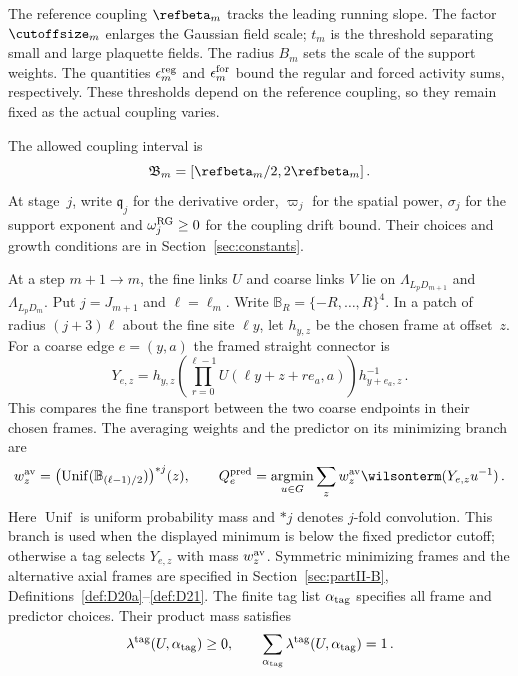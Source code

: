 The reference coupling $\refbeta_m$ tracks the leading running slope. The factor $\cutoffsize_m$ enlarges the Gaussian field scale; $t_m$ is the threshold separating small and large plaquette fields. The radius $B_m$ sets the scale of the support weights. The quantities $\epsilon_m^{\rm reg}$ and $\epsilon_m^{\rm for}$ bound the regular and forced activity sums, respectively. These thresholds depend on the reference coupling, so they remain fixed as the actual coupling varies.

The allowed coupling interval is
\begin{equation*}
\mathfrak B_m=[\refbeta_m/2,2\refbeta_m]\,.
\end{equation*}
At stage~$j$, write $\mathfrak q_j$ for the derivative order, $\varpi_j$ for the spatial power, $\sigma_j$ for the support exponent and $\omega_j^{\rm RG}\ge0$ for the coupling drift bound. Their choices and growth conditions are in Section~\ref{sec:constants}.

At a step $m+1\to m$, the fine links $U$ and coarse links $V$ lie on $\Lambda_{L_pD_{m+1}}$ and $\Lambda_{L_pD_m}$. Put $j=J_{m+1}$ and $\ell=\ell_m$. Write $\mathbb B_R=\{-R,\ldots,R\}^4$. In a patch of radius $(j+3)\ell$ about the fine site $\ell y$, let $h_{y,z}$ be the chosen frame at offset~$z$. For a coarse edge $e=(y,a)$ the framed straight connector is
\begin{equation}\label{eq:I12-framed-connector}
Y_{e,z}=h_{y,z}\left(\prod_{r=0}^{\ell-1}U(\ell y+z+re_a,a)\right)h_{y+e_a,z}^{-1}\,.
\end{equation}
This compares the fine transport between the two coarse endpoints in their chosen frames. The averaging weights and the predictor on its minimizing branch are
\begin{equation}\label{eq:I12-predictor}
w_z^{\rm av}=\bigl(\operatorname{Unif}(\mathbb B_{(\ell-1)/2})\bigr)^{*j}(z),\qquad
Q_e^{\rm pred}=\operatorname*{argmin}_{u\in G}\sum_z w_z^{\rm av}\wilsonterm(Y_{e,z}u^{-1})\,.
\end{equation}
Here $\operatorname{Unif}$ is uniform probability mass and $*j$ denotes $j$-fold convolution. This branch is used when the displayed minimum is below the fixed predictor cutoff; otherwise a tag selects $Y_{e,z}$ with mass $w_z^{\rm av}$. Symmetric minimizing frames and the alternative axial frames are specified in Section~\ref{sec:partII-B}, Definitions~\ref{def:D20a}--\ref{def:D21}. The finite tag list $\alpha_{\rm tag}$ specifies all frame and predictor choices. Their product mass satisfies
\begin{equation}\label{eq:I12-tag-mass}
\lambda^{\rm tag}(U,\alpha_{\rm tag})\ge0,\qquad
\sum_{\alpha_{\rm tag}}\lambda^{\rm tag}(U,\alpha_{\rm tag})=1\,.
\end{equation}

